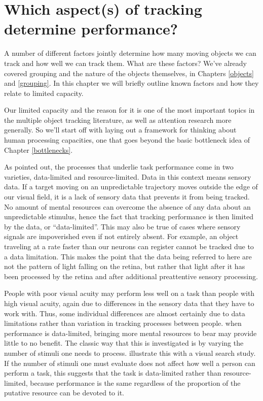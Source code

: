 \documentclass[
]{book}
\begin{document}
\hypertarget{whichAspects}{%
\chapter{Which aspect(s) of tracking determine performance?}\label{whichAspects}}

A number of different factors jointly determine how many moving objects we can track and how well we can track them. What are these factors? We've already covered grouping and the nature of the objects themselves, in Chapters \ref{objects} and \ref{grouping}. In this chapter we will briefly outline known factors and how they relate to limited capacity.

Our limited capacity and the reason for it is one of the most important topics in the multiple object tracking literature, as well as attention research more generally. So we'll start off with laying out a framework for thinking about human processing capacities, one that goes beyond the basic bottleneck idea of Chapter \ref{bottlenecks}.

As \citet{normanDatalimitedResourcelimitedProcesses1975} pointed out, the processes that underlie task performance come in two varieties, data-limited and resource-limited. Data in this context means sensory data. If a target moving on an unpredictable trajectory moves outside the edge of our visual field, it is a lack of sensory data that prevents it from being tracked. No amount of mental resources can overcome the absence of any data about an unpredictable stimulus, hence the fact that tracking performance is then limited by the data, or ``data-limited''. This may also be true of cases where sensory signals are impoverished even if not entirely absent. For example, an object traveling at a rate faster than our neurons can register cannot be tracked due to a data limitation. This makes the point that the data being referred to here are not the pattern of light falling on the retina, but rather that light after it has been processed by the retina and after additional preattentive sensory processing.

People with poor visual acuity may perform less well on a task than people with high visual acuity, again due to differences in the sensory data that they have to work with. Thus, some individual differences are almost certainly due to data limitations rather than variation in tracking processes between people. when performance is data-limited, bringing more mental resources to bear may provide little to no benefit. The classic way that this is investigated is by varying the number of stimuli one needs to process. \citet{normanDatalimitedResourcelimitedProcesses1975} illustrate this with a visual search study. If the number of stimuli one must evaluate does not affect how well a person can perform a task, this suggests that the task is data-limited rather than resource-limited, because performance is the same regardless of the proportion of the putative resource can be devoted to it.
\end{document}
